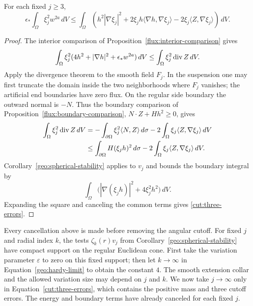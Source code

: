 \begin{lemma}\label{cut:integrated-comparison}
For each fixed $j\geq3$,
\begin{equation}\label{cut:three-errors}
 \epsilon_*\int_\Omega\xi_j^2w^{2a}\,dV
 \leq\int_\Omega\left(
    h^2|\nabla\xi_j|^2
   +2\xi_jh\langle\nabla h,\nabla\xi_j\rangle
   -2\xi_j\langle Z,\nabla\xi_j\rangle\right)\,dV.
\end{equation}
\end{lemma}

\begin{proof}
The interior comparison of Proposition~\ref{flux:interior-comparison}
gives
\[
 \int_\Omega\xi_j^2
       (4h^2+|\nabla h|^2+\epsilon_*w^{2a})\,dV
 \leq\int_\Omega\xi_j^2\operatorname{div} Z\,dV.
\]
Apply the divergence theorem to the smooth field $F_j$.  In the
suspension one may first truncate the domain inside the two neighborhoods
where $F_j$ vanishes; the artificial end boundaries have zero flux.
On the regular side boundary the outward normal is $-N$.  Thus the
boundary comparison of Proposition~\ref{flux:boundary-comparison},
$N\cdot Z+Hh^2\geq0$, gives
\begin{align*}
 \int_\Omega\xi_j^2\operatorname{div} Z\,dV
 &=-\int_{\partial\Omega}\xi_j^2\langle N,Z\rangle\,d\sigma
       -2\int_\Omega\xi_j\langle Z,\nabla\xi_j\rangle\,dV\\
 &\leq\int_{\partial\Omega}H(\xi_jh)^2\,d\sigma
       -2\int_\Omega\xi_j\langle Z,\nabla\xi_j\rangle\,dV.
\end{align*}
Corollary~\ref{geo:spherical-stability} applies to $v_j$ and bounds the
boundary integral by
\[
 \int_\Omega\bigl(|\nabla(\xi_jh)|^2+4\xi_j^2h^2\bigr)\,dV.
\]
Expanding the square and canceling the common terms gives
\eqref{cut:three-errors}.
\end{proof}

Every cancellation above is made before removing the angular cutoff.
For fixed $j$ and radial index $k$, the tests $\zeta_k(r)v_j$ from
Corollary~\ref{geo:spherical-stability} have compact support on the
regular Euclidean cone.  First take the variation parameter
$\varepsilon$ to zero on this fixed support; then let $k\to\infty$
in Equation~\eqref{geo:hardy-limit} to obtain the constant $4$.
The smooth extension collar and the allowed variation size may depend
on $j$ and $k$.  We now take $j\to\infty$ only in
Equation~\eqref{cut:three-errors}, which contains the positive mass
and three cutoff errors.  The energy and boundary terms have already
canceled for each fixed $j$.

